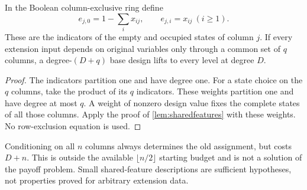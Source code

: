 \begin{lemma}\label{lem:columnconditioning}
In the Boolean column-exclusive ring define
\[
 e_{j,0}=1-\sum_i x_{ij},\qquad e_{j,i}=x_{ij}\ (i\ge1).
\]
These are the indicators of the empty and occupied states of column $j$. If every extension input depends on original variables only through a common set of $q$ columns, a degree-$(D+q)$ base design lifts to every level at degree $D$.
\end{lemma}
\begin{proof}
The indicators partition one and have degree one. For a state choice on the $q$ columns, take the product of its $q$ indicators. These weights partition one and have degree at most $q$. A weight of nonzero design value fixes the complete states of all those columns. Apply the proof of \cref{lem:sharedfeatures} with these weights. No row-exclusion equation is used.
\end{proof}

\begin{remark}
Conditioning on all $n$ columns always determines the old assignment, but costs $D+n$. This is outside the available $\lfloor n/2\rfloor$ starting budget and is not a solution of the payoff problem. Small shared-feature descriptions are sufficient hypotheses, not properties proved for arbitrary extension data.
\end{remark}
